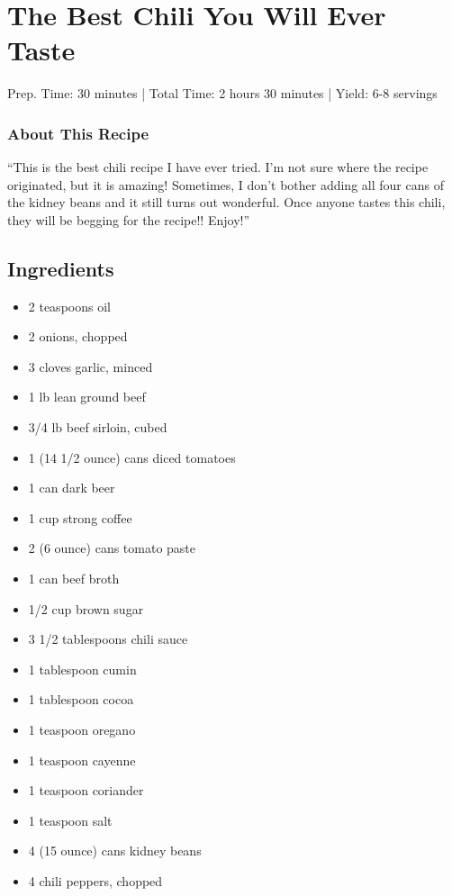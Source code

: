 \section{The Best Chili You Will Ever Taste}

Prep. Time: 30 minutes |
Total Time: 2 hours 30 minutes | 
Yield: 6-8 servings

\subsubsection{About This Recipe}

``This is the best chili recipe I have ever tried. I'm not sure where the recipe
originated, but it is amazing! Sometimes, I don't bother adding all four cans
of the kidney beans and it still turns out wonderful. Once anyone tastes this
chili, they will be begging for the recipe!! Enjoy!''

\subsection{Ingredients}
\begin{multicols}{2}
\begin{itemize}
    \item 2 teaspoons oil
    \item 2 onions, chopped
    \item 3 cloves garlic, minced
    \item 1 lb lean ground beef
    \item 3/4 lb beef sirloin, cubed
    \item 1 (14 1/2 ounce) cans diced tomatoes
    \item 1 can dark beer
    \item 1 cup strong coffee
    \item 2 (6 ounce) cans tomato paste
    \item 1 can beef broth
    \item 1/2 cup brown sugar
    \item 3 1/2 tablespoons chili sauce
    \item 1 tablespoon cumin
    \item 1 tablespoon cocoa
    \item 1 teaspoon oregano
    \item 1 teaspoon cayenne
    \item 1 teaspoon coriander
    \item 1 teaspoon salt
    \item 4 (15 ounce) cans kidney beans
    \item 4 chili peppers, chopped
\end{itemize}
\end{multicols}

